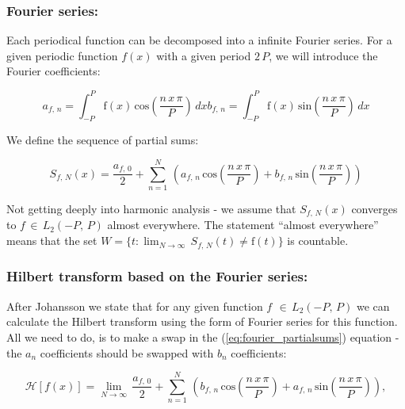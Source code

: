 \documentclass[12pt,twoside,a4paper]{article}
\numberwithin{equation}{subsection}
\numberwithin{figure}{subsection}
\begin{document}
\subsubsection*{Fourier series:} 

Each periodical function can be decomposed into a infinite Fourier series. For a given periodic function $f(x)$ with a given period $2 \, P$, we will introduce the Fourier coefficients:

\begin{subequations} \label{eq:fourier_coeffs}
  \begin{equation}   \label{eq:fcoeffs_an}
    {a_{f, \,n}}=\int_{ -P}^{P}\mathrm{f}(x) \, \mathrm{cos}(\frac{n \, x\, \pi}{P}) \, dx
  \end{equation}
  \begin{equation}   \label{eq:fcoeffs_bn}
    {b_{f, \,n}}=\int_{ -P}^{P}\mathrm{f}(x) \, \mathrm{sin}(\frac{n \, x\, \pi}{P}) \, dx
  \end{equation}
\end{subequations}

We define the sequence of partial sums:

\begin{equation} \label{eq:fourier_partialsums}
	S_{f, \,N}(x) = \frac {{a_{f, \,0}}}{2} + \sum_{n=1}^{N} \, 
  		\left(
  			{a_{f, \, n}} \, \mathrm{cos}(\frac{n \, x\, \pi}{P}) 
   	      + {b_{f, \, n}} \, \mathrm{sin}(\frac{n \, x\, \pi}{P})
		\right)
\end{equation}

Not getting deeply into harmonic analysis - we assume that $S_{f, \,N}(x)$  converges to $f \, \in \,{L_{2}}( - P, \,P)$ almost everywhere. The statement ``almost everywhere'' means that the set $W = \{t : \lim_{N \rightarrow \infty } \, {S_{f, \,N}}(t) \neq \mathrm{f}(t) \}$ is countable.

\subsubsection*{Hilbert transform based on the Fourier series:}

After Johansson \cite{johansson_hilbert} we state that for any given function $f\,\ \in \,{L_{2}}( - P, \,P)$ we can calculate the Hilbert transform using the form of Fourier series for this function. All we need to do, is to make a swap in the (\ref{eq:fourier_partialsums}) equation - the ${a_{n}}$ coefficients should be swapped with ${b_{n}}$ coefficients:

\begin{equation} \label{eq:fourier_hilbert}
	\mathcal{H}[f(x)] = \lim_{N\rightarrow \infty } \, \frac {{a_{f, \, 0}}}{2}  + \sum_{ n=1}^{N} \, 
		\left(
	  		  {b_{f, \,n}} \, \mathrm{cos}(\frac{n \, x\, \pi}{P}) 
			  + {a_{f, \,n}} \, \mathrm{sin}(\frac{n \, x\, \pi}{P})
		\right),
\end{equation}
\end{document}
